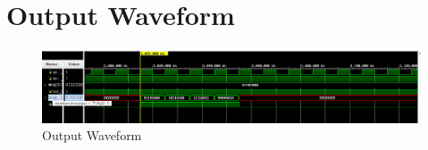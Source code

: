 \documentclass{article}
\begin{document}
\vspace{3cm}


\section{Output Waveform}
\vspace{1cm}
\begin{figure}[h]
\centering
\includegraphics[width=1.2\textwidth]{figs/p1wav.png}
    \caption{Output Waveform}
    \label{fig:my_label}
\end{figure}
\end{document}

